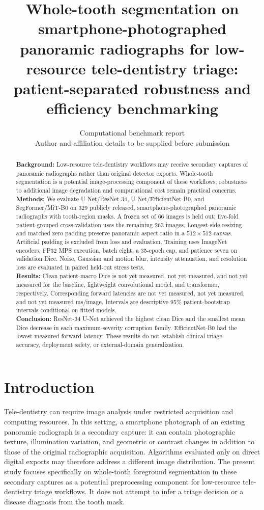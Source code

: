 \documentclass[11pt]{article}
\title{Whole-tooth segmentation on smartphone-photographed panoramic radiographs for low-resource tele-dentistry triage: patient-separated robustness and efficiency benchmarking}
\author{Computational benchmark report\\[3pt]\small Author and affiliation details to be supplied before submission}
\date{}
\providecommand{\BaselineDice}{not yet measured}
\providecommand{\CNNDice}{not yet measured}
\providecommand{\TransformerDice}{not yet measured}
\providecommand{\BaselineLatency}{not yet measured}
\providecommand{\CNNLatency}{not yet measured}
\providecommand{\TransformerLatency}{not yet measured}
\begin{document}
\maketitle
\begin{abstract}
\noindent\textbf{Background:} Low-resource tele-dentistry workflows may receive secondary captures of panoramic radiographs rather than original detector exports. Whole-tooth segmentation is a potential image-processing component of these workflows; robustness to additional image degradation and computational cost remain practical concerns.\\
\textbf{Methods:} We evaluate U-Net/ResNet-34, U-Net/EfficientNet-B0, and SegFormer/MiT-B0 on 329 publicly released, smartphone-photographed panoramic radiographs with tooth-region masks. A frozen set of 66 images is held out; five-fold patient-grouped cross-validation uses the remaining 263 images. Longest-side resizing and matched zero padding preserve panoramic aspect ratio in a $512\times512$ canvas. Artificial padding is excluded from loss and evaluation. Training uses ImageNet encoders, FP32 MPS execution, batch eight, a 35-epoch cap, and patience seven on validation Dice. Noise, Gaussian and motion blur, intensity attenuation, and resolution loss are evaluated in paired held-out stress tests.\\
\textbf{Results:} Clean patient-macro Dice is \BaselineDice{}, \CNNDice{}, and \TransformerDice{} for the baseline, lightweight convolutional model, and transformer, respectively. Corresponding forward latencies are \BaselineLatency{}, \CNNLatency{}, and \TransformerLatency{} ms/image. Intervals are descriptive 95\% patient-bootstrap intervals conditional on fitted models.\\
\textbf{Conclusion:} ResNet-34 U-Net achieved the highest clean Dice and the smallest mean Dice decrease in each maximum-severity corruption family. EfficientNet-B0 had the lowest measured forward latency. These results do not establish clinical triage accuracy, deployment safety, or external-domain generalization.
\end{abstract}

\section{Introduction}
Tele-dentistry can require image analysis under restricted acquisition and computing resources. In this setting, a smartphone photograph of an existing panoramic radiograph is a secondary capture: it can contain photographic texture, illumination variation, and geometric or contrast changes in addition to those of the original radiographic acquisition. Algorithms evaluated only on direct digital exports may therefore address a different image distribution. The present study focuses specifically on whole-tooth foreground segmentation in these secondary captures as a potential preprocessing component for low-resource tele-dentistry triage workflows. It does not attempt to infer a triage decision or a disease diagnosis from the tooth mask.
\end{document}
